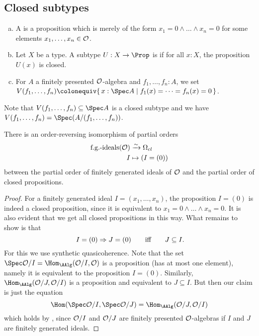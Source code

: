 
\subsection{Closed subtypes}

\begin{definition}%
  \label{closed-proposition}\label{closed-subtype}
  \begin{enumerate}[(a)]
  \item
    A  is a proposition
    which is merely of the form $x_1 = 0 \land \dots \land x_n = 0$
    for some elements $x_1, \dots, x_n \in \mathcal O$.
  \item
    Let $X$ be a type.
    A subtype $U : X \to \Prop$ is 
    if for all $x : X$, the proposition $U(x)$ is closed.
  \item
    For $A$ a finitely presented $\mathcal O$-algebra
    and $f_1, \dots, f_n : A$,
    we set
    $V(f_1, \dots, f_n) \colonequiv
    \{\, x : \Spec A \mid f_1(x) = \dots = f_n(x) = 0 \,\}$.
  \end{enumerate}
\end{definition}

Note that $V(f_1, \dots, f_n) \subseteq \Spec A$ is a closed subtype
and we have $V(f_1, \dots, f_n) = \Spec (A/(f_1, \dots, f_n))$.

\begin{proposition}%
  There is an order-reversing isomorphism of partial orders
  \begin{align*}
    \text{f.g.-ideals}(\mathcal O) &\xrightarrow{{\sim}} \Omega_{cl} \\
    I &\mapsto (I = (0))
  \end{align*}
  between the partial order of finitely generated ideals of $\mathcal O$
  and the partial order of closed propositions.
\end{proposition}

\begin{proof}
  For a finitely generated ideal $I = (x_1, \dots, x_n)$,
  the proposition $I = (0)$ is indeed a closed proposition,
  since it is equivalent to $x_1 = 0 \land \dots \land x_n = 0$.
  It is also evident that we get all closed propositions in this way.
  What remains to show is that
  \[ I = (0) \Rightarrow J = (0)
     \qquad\text{iff}\qquad
     J \subseteq I
     \rlap{\text{.}}
  \]
  For this we use synthetic quasicoherence.
  Note that the set $\Spec \A/I = \Hom_{\AAlg}(\A/I, \A)$ is a proposition
  (has at most one element),
  namely it is equivalent to the proposition $I = (0)$.
  Similarly, $\Hom_{\AAlg}(\A/J, \A/I)$ is a proposition
  and equivalent to $J \subseteq I$.
  But then our claim is just the equation
  \[ \Hom(\Spec \A/I, \Spec \A/J) = \Hom_{\AAlg}(\A/J, \A/I) \]
  which holds by ,
  since $\mathcal O/I$ and $\mathcal O/J$ are finitely presented $\mathcal O$-algebras
  if $I$ and $J$ are finitely generated ideals.
\end{proof}

